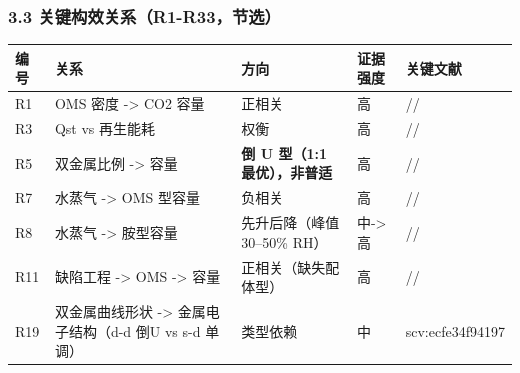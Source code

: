 \documentclass[12pt,a4paper]{ctexart}
\begin{document}
\subsubsection{3.3 关键构效关系（R1-R33，节选）}\label{ux5173ux952eux6784ux6548ux5173ux7cfbr1-r33ux8282ux9009}

{\def\LTcaptype{none} %
\begin{longtable}[]{@{}
  >{\raggedright\arraybackslash}p{}
  >{\raggedright\arraybackslash}p{}
  >{\raggedright\arraybackslash}p{}
  >{\raggedright\arraybackslash}p{}
  >{\raggedright\arraybackslash}p{}@{}}
\toprule\noalign{}
\begin{minipage}[b]{\linewidth}\raggedright
编号
\end{minipage} & \begin{minipage}[b]{\linewidth}\raggedright
关系
\end{minipage} & \begin{minipage}[b]{\linewidth}\raggedright
方向
\end{minipage} & \begin{minipage}[b]{\linewidth}\raggedright
证据强度
\end{minipage} & \begin{minipage}[b]{\linewidth}\raggedright
关键文献
\end{minipage} \\
\midrule\noalign{}
\endhead
\bottomrule\noalign{}
\endlastfoot
R1 & OMS 密度 -\textgreater{} CO2 容量 & 正相关 & 高 & \cite{p10}/\cite{p13}/\cite{p192} \\
R3 & Qst vs 再生能耗 & 权衡 & 高 & \cite{p27}/\cite{p176}/\cite{p178} \\
R5 & 双金属比例 -\textgreater{} 容量 & \textbf{倒 U 型（1:1 最优），非普适} & 高 & \cite{p65}/\cite{p67}/\cite{p147} \\
R7 & 水蒸气 -\textgreater{} OMS 型容量 & 负相关 & 高 & \cite{p186}/\cite{p182}/\cite{p196} \\
R8 & 水蒸气 -\textgreater{} 胺型容量 & 先升后降（峰值 30--50\% RH） & 中-\textgreater 高 & \cite{p224}/\cite{p116}/\cite{p201} \\
R11 & 缺陷工程 -\textgreater{} OMS -\textgreater{} 容量 & 正相关（缺失配体型） & 高 & \cite{p7}/\cite{p13}/\cite{p192} \\
R19 & 双金属曲线形状 -\textgreater{} 金属电子结构（d-d 倒U vs s-d 单调） & 类型依赖 & 中 & scv:ecfe34f94197 \\

\end{longtable}}
\end{document}
